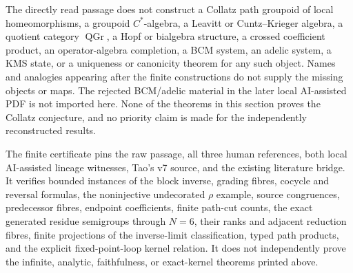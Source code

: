 \begin{nonclaim}
The directly read passage does not construct a Collatz path groupoid of local
homeomorphisms, a groupoid $C^*$-algebra, a Leavitt or Cuntz--Krieger algebra,
a quotient category $\operatorname{QGr}$, a Hopf or bialgebra structure, a
crossed coefficient product, an operator-algebra completion, a BCM system, an
adelic system, a KMS state, or a uniqueness or canonicity theorem for any such
object.  Names and analogies appearing after the finite constructions do not
supply the missing objects or maps.  The rejected BCM/adelic material in the
later local AI-assisted PDF is not imported here.  None of the theorems in
this section proves the Collatz conjecture, and no priority claim is made for
the independently reconstructed results.
\end{nonclaim}

The finite certificate
 pins the raw
passage, all three human references, both local AI-assisted lineage witnesses,
Tao's v7 source, and the existing literature bridge.  It verifies bounded
instances of the block inverse, grading fibres, cocycle and reversal formulas,
the noninjective undecorated $\rho$ example, source congruences, predecessor
fibres, endpoint coefficients, finite path-cut counts, the exact generated
residue semigroups through $N=6$, their ranks and adjacent reduction fibres,
finite projections of the inverse-limit classification, typed path products,
and the explicit fixed-point-loop kernel relation.  It does not independently
prove the infinite, analytic, faithfulness, or exact-kernel theorems printed
above.
